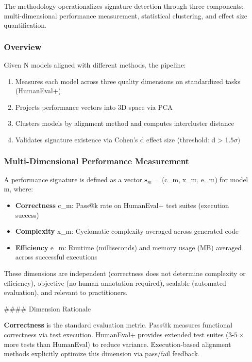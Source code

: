 
The methodology operationalizes signature detection through three components: multi-dimensional performance measurement, statistical clustering, and effect size quantification.

\subsubsection{Overview}

Given N models aligned with different methods, the pipeline:

\begin{enumerate}
\item Measures each model across three quality dimensions on standardized tasks (HumanEval+)
\item Projects performance vectors into 3D space via PCA
\item Clusters models by alignment method and computes intercluster distance
\item Validates signature existence via Cohen's d effect size (threshold: d > 1.$5\sigma )$
\end{enumerate}

\subsubsection{Multi-Dimensional Performance Measurement}

A performance signature is defined as a vector \textbf{s}$_{m}$ = (c\_m, x\_m, e\_m) for model m, where:

\begin{itemize}
\item \textbf{Correctness} c\_m: Pass@k rate on HumanEval+ test suites (execution success)
\item \textbf{Complexity} x\_m: Cyclomatic complexity averaged across generated code
\item \textbf{Efficiency} e\_m: Runtime (milliseconds) and memory usage (MB) averaged across successful executions
\end{itemize}

These dimensions are independent (correctness does not determine complexity or efficiency), objective (no human annotation required), scalable (automated evaluation), and relevant to practitioners.

\#\#\#\# Dimension Rationale

\textbf{Correctness} is the standard evaluation metric. Pass@k measures functional correctness via test execution. HumanEval+ provides extended test suites (3-$5\times$ more tests than HumanEval) to reduce variance. Execution-based alignment methods explicitly optimize this dimension via pass/fail feedback.

